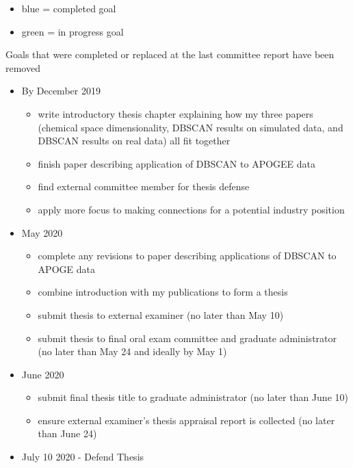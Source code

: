 \documentclass[11pt]{article}
\begin{document}
    \begin{itemize}
    	\item {\color{RoyalBlue}blue} = completed goal
    	\item {\color{ForestGreen} green} = in progress goal
    \end{itemize}

Goals that were completed or replaced at the last committee report have been removed

\begin{itemize}

\item By December 2019
\begin{itemize}
\item {\color{ForestGreen} write introductory thesis chapter explaining how my three papers (chemical space dimensionality, DBSCAN results on simulated data, and DBSCAN results on real data) all fit together}
\item {\color{RoyalBlue}finish paper describing application of DBSCAN to APOGEE data}
\item {\color{RoyalBlue} find external committee member for thesis defense}
\item {\color{ForestGreen} apply more focus to making connections for a potential industry position}
\end{itemize}
\item May 2020
\begin{itemize}
\item {complete any revisions to paper describing applications of DBSCAN to APOGE data}
\item {\color{ForestGreen} combine introduction with my publications to form a thesis}
\item {submit thesis to external examiner (no later than May 10)}
\item submit thesis to final oral exam committee and graduate administrator (no later than May 24 and ideally by May 1)
\end{itemize}
\item June 2020
\begin{itemize}
\item submit final thesis title to graduate administrator (no later than June 10)
\item ensure external examiner's thesis appraisal report is collected (no later than June 24) 
\end{itemize}
\item July 10 2020 - Defend Thesis
\end{itemize}



\end{document}
